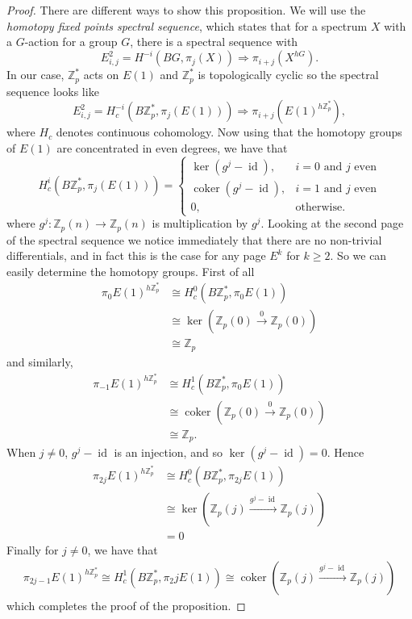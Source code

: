 \documentclass[a4paper]{article} %
\theoremstyle{definition}
\newcommand{\toWithMapLong}[1]{\overset{#1}{\longrightarrow}}
\newcommand{\Z}{\mathbb{Z}}
\DeclareMathOperator{\id}{id}           %
\DeclareMathOperator{\coker}{coker}     %
\renewcommand{\implies}{\Rightarrow}    %
\begin{document}
\begin{proof}
There are different ways to show this proposition. We will use the \textit{homotopy fixed points spectral sequence}, which states that for a spectrum $X$ with a $G$-action for a group $G$, there is a spectral sequence with
\[
E^2_{i,j} = H^{-i}(BG, \pi_j(X)) \implies \pi_{i+j}(X^{hG}).
\]
In our case, $\Z_p^*$ acts on $E(1)$ and $\Z_p^*$ is topologically cyclic so the spectral sequence looks like
\[
E^2_{i,j} = H_c^{-i}(B\Z_p^*, \pi_j(E(1))) \implies \pi_{i+j}(E(1)^{h\Z_p^*}),
\]
where $H_c$ denotes continuous cohomology. Now using that the homotopy groups of $E(1)$ are concentrated in even degrees, we have that
\[
  H^i_c(B\Z_p^*, \pi_j(E(1))) =
\begin{cases}
\ker (g^j - \id), & i=0 \text{ and } j \text{ even} \\
\coker (g^j - \id), & i=1 \text{ and } j \text{ even} \\
0, & \text{otherwise.}
\end{cases}
\]
where $g^j \colon \Z_p(n) \to \Z_p(n)$ is multiplication by $g^j$. Looking at the second page of the spectral sequence we notice immediately that there are no non-trivial differentials, and in fact this is the case for any page $E^k$ for $k \ge 2$. So we can easily determine the homotopy groups. First of all
\begin{align*}
  \pi_0 E(1)^{h\Z_p^*} & \cong  H^0_c(B\Z_p^*, \pi_0 E(1)) \\
    & \cong \ker (\Z_p(0) \toWithMapLong{0} \Z_p(0)) \\
    & \cong \Z_p
\end{align*}
and similarly,
\begin{align*}
  \pi_{-1} E(1)^{h\Z_p^*} & \cong  H^1_c(B\Z_p^*, \pi_0 E(1)) \\
    & \cong \coker (\Z_p(0) \toWithMapLong{0} \Z_p(0)) \\
    & \cong \Z_p.
\end{align*}
When $j \neq 0$, $g^j - \id$ is an injection, and so $\ker(g^j - \id) = 0$. Hence
\begin{align*}
  \pi_{2j} E(1)^{h\Z_p^*} & \cong  H^0_c(B\Z_p^*, \pi_{2j} E(1)) \\
    & \cong \ker (\Z_p(j) \toWithMapLong{g^j - \id} \Z_p(j)) \\
    &  = 0
\end{align*}
Finally for $j \neq 0$, we have that
\begin{align*}
  \pi_{2j-1} E(1)^{h\Z_p^*}  \cong  H^1_c(B\Z_p^*, \pi_2j E(1))
    \cong \coker (\Z_p(j) \toWithMapLong{g^j - \id} \Z_p(j))
\end{align*}
which completes the proof of the proposition.
\end{proof}
\end{document}
